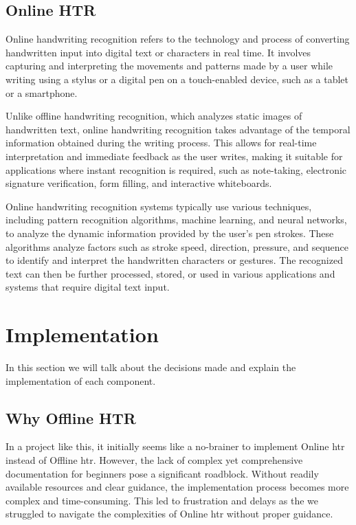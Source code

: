 \subsection{Online HTR}
Online handwriting recognition refers to the technology and process of converting handwritten input into digital text or characters in real time. It involves capturing and interpreting the movements and patterns made by a user while writing using a stylus or a digital pen on a touch-enabled device, such as a tablet or a smartphone.

Unlike offline handwriting recognition, which analyzes static images of handwritten text, online handwriting recognition takes advantage of the temporal information obtained during the writing process. This allows for real-time interpretation and immediate feedback as the user writes, making it suitable for applications where instant recognition is required, such as note-taking, electronic signature verification, form filling, and interactive whiteboards.

Online handwriting \textit{\cite{OnlineHTR}} recognition systems typically use various techniques, including pattern recognition algorithms, machine learning, and neural networks, to analyze the dynamic information provided by the user's pen strokes. These algorithms analyze factors such as stroke speed, direction, pressure, and sequence to identify and interpret the handwritten characters or gestures. The recognized text can then be further processed, stored, or used in various applications and systems that require digital text input.


\section{Implementation}
In this section we will talk about the decisions made and explain the implementation of each component.
\subsection{Why Offline HTR}
In a project like this, it initially seems like a no-brainer to implement Online \gls{htr} instead of Offline \gls{htr}. However, the lack of complex yet comprehensive documentation for beginners pose a significant roadblock. Without readily available resources and clear guidance, the implementation process becomes more complex and time-consuming. This led to frustration and delays as the we struggled to navigate the complexities of Online \gls{htr} without proper guidance.


